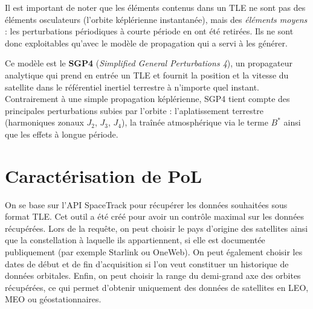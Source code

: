 \documentclass{article}
\begin{document}
\vspace{0.3cm}
\noindent{}
\vspace{0.5cm}

Il est important de noter que les éléments contenus dans un TLE ne sont pas des éléments osculateurs (l'orbite képlérienne instantanée), mais des \textit{éléments moyens} : les perturbations périodiques à courte période en ont été retirées.
Ils ne sont donc exploitables qu'avec le modèle de propagation qui a servi à les générer.

Ce modèle est le \textbf{SGP4} (\textit{Simplified General Perturbations 4}), un propagateur analytique qui prend en entrée un TLE et fournit la position et la vitesse du satellite dans le référentiel inertiel terrestre à n'importe quel instant.
Contrairement à une simple propagation képlérienne, SGP4 tient compte des principales perturbations subies par l'orbite : l'aplatissement terrestre (harmoniques zonaux $J_2$, $J_3$, $J_4$), la traînée atmosphérique via le terme $B^*$ ainsi que les effets à longue période.


\section{Caractérisation de PoL}
\par 
On se base sur l'API SpaceTrack pour récupérer les données souhaitées sous format TLE. Cet outil a été créé pour avoir un contrôle maximal sur les données récupérées.
Lors de la requête, on peut choisir le pays d'origine des satellites ainsi que la constellation à laquelle ils appartiennent, si elle est documentée publiquement (par exemple Starlink ou OneWeb).
On peut également choisir les dates de début et de fin d'acquisition si l'on veut constituer un historique de données orbitales.
Enfin, on peut choisir la range du demi-grand axe des orbites récupérées, ce qui permet d'obtenir uniquement des données de satellites en LEO, MEO ou géostationnaires.
\end{document}
